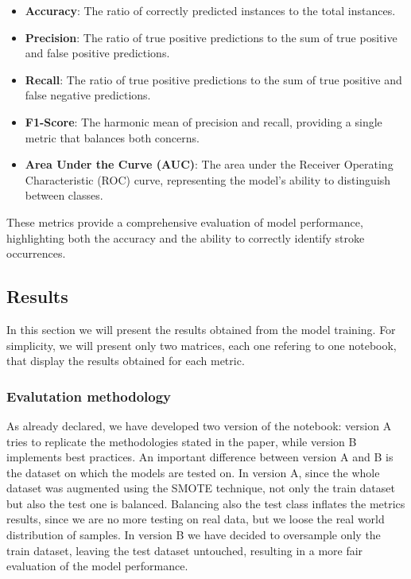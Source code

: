 \documentclass[twocolumn, 9pt]{extarticle}
\begin{document}
\begin{itemize}
    \item \textbf{Accuracy}: The ratio of correctly predicted instances to the total instances.
    \item \textbf{Precision}: The ratio of true positive predictions to the sum of true positive and false positive predictions.
    \item \textbf{Recall}: The ratio of true positive predictions to the sum of true positive and false negative predictions.
    \item \textbf{F1-Score}: The harmonic mean of precision and recall, providing a single metric that balances both concerns.
    \item \textbf{Area Under the Curve (AUC)}: The area under the Receiver Operating Characteristic (ROC) curve, representing the model's ability to distinguish between classes.
\end{itemize}

These metrics provide a comprehensive evaluation of model performance, highlighting both the accuracy and the ability to correctly identify stroke occurrences.

\subsection{Results}
In this section we will present the results obtained from the model training. For simplicity, we will present only two matrices, each one refering to one notebook, that display the results obtained for each metric.

\subsubsection{Evalutation methodology}
As already declared, we have developed two version of the notebook: version A tries to replicate the methodologies stated in the paper, while version B implements best practices. An important difference between version A and B is the dataset on which the models are tested on. In version A, since the whole dataset was augmented using the SMOTE technique, not only the train dataset but also the test one is balanced. Balancing also the test class inflates the metrics results, since we are no more testing on real data, but we loose the real world distribution of samples. In version B we have decided to oversample only the train dataset, leaving the test dataset untouched, resulting in a more fair evaluation of the model performance.
\end{document}
